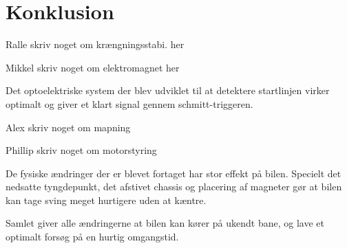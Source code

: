 
\section{Konklusion}
Ralle skriv noget om krængningsstabi. her

Mikkel skriv noget om elektromagnet her

Det optoelektriske system der blev udviklet til at detektere startlinjen virker optimalt og giver et klart signal gennem schmitt-triggeren. 

Alex skriv noget om mapning

Phillip skriv noget om motorstyring

De fysiske ændringer der er blevet fortaget har stor effekt på bilen. Specielt det nedsatte tyngdepunkt, det afstivet chassis og placering af magneter gør at bilen kan tage sving meget hurtigere uden at kæntre. 

Samlet giver alle ændringerne at bilen kan kører på ukendt bane, og lave et optimalt forsøg på en hurtig omgangstid. 